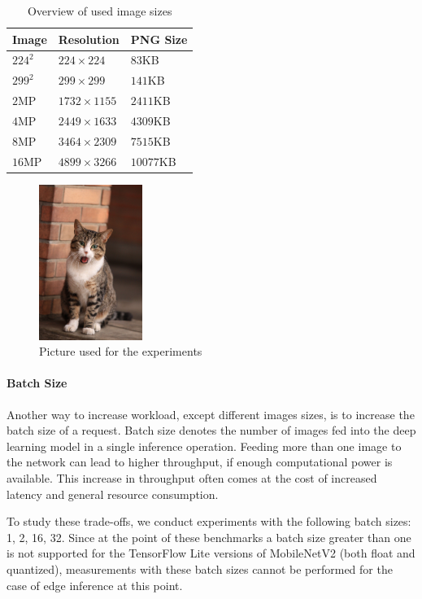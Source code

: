 \begin{table}[!htb]
\centering
\caption{Overview of used image sizes}
\label{table:imagesOverview}
\begin{tabular}{@{}lll@{}}
\toprule
Image   & Resolution       & PNG Size  \\ \midrule
$224^2$ & $224\times224$   & $83$KB    \\
$299^2$ & $299\times299$   & $141$KB   \\
$2$MP   & $1732\times1155$ & $2411$KB  \\
$4$MP   & $2449\times1633$ & $4309$KB  \\
$8$MP   & $3464\times2309$ & $7515$KB  \\
$16$MP  & $4899\times3266$ & $10077$KB \\ \bottomrule
\end{tabular}
\end{table}
\begin{figure}[!htb]
\centering
\includegraphics[width=0.3\textwidth]{./Bilder/European_cat_compressed.jpg}
\caption{Picture used for the experiments \cite{cat}}
\label{fig:cat}
\end{figure}
\paragraph{Batch Size}
Another way to increase workload, except different images sizes, is to increase the batch size of a request.
Batch size denotes the number of images fed into the deep learning model in a single inference operation. 
Feeding more than one image to the network can lead to higher throughput, if enough computational power is available. This increase in throughput often comes at the cost of increased latency and general resource consumption.

To study these trade-offs, we conduct experiments with the following batch sizes: 1, 2, 16, 32. Since at the point of these benchmarks a batch size greater than one is not supported for the TensorFlow Lite versions of MobileNetV2 (both float and quantized), measurements with these batch sizes cannot be performed for the case of edge inference at this point.

